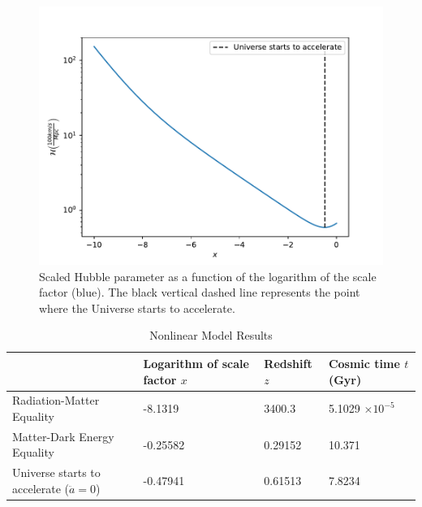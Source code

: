 \documentclass{aa}
\begin{document}
\begin{figure}[ht]
\centering
\includegraphics[width=\hsize]{figures/Hp.pdf}
  \caption{Scaled Hubble parameter as a function of the logarithm of the scale factor (blue). The black vertical dashed line represents the point where the Universe starts to accelerate.}
     \label{fig:Hp}
\end{figure}

\begin{table}[ht]
\caption{Nonlinear Model Results}             
\label{table:times}      
\centering          
\begin{tabular}{l l l l}     %
\hline\hline       
& Logarithm of scale factor $x$      & Redshift $z$     & Cosmic time $t$ (Gyr)\\ 
\hline                    
Radiation-Matter Equality   & -8.1319  & 3400.3  & 5.1029 $\times 10^{-5}$ \\
Matter-Dark Energy Equality & -0.25582 & 0.29152 & 10.371                 \\
Universe starts to accelerate ($\ddot a = 0$)               & -0.47941 & 0.61513 & 7.8234\\ 
\hline                  
\end{tabular}
\end{table}
\end{document}
